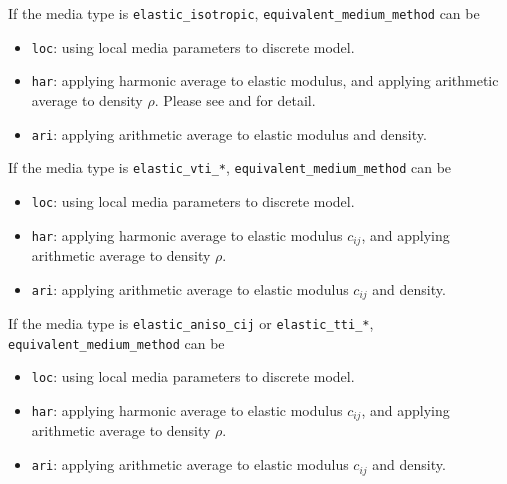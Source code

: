 If the media type is \texttt{elastic\_isotropic}, \texttt{equivalent\_medium\_method} can be
\begin{itemize}
 \item \texttt{loc}: using local media parameters to discrete model. 
 \item \texttt{har}: applying harmonic average to elastic modulus, and applying arithmetic average to density $\rho$. Please see \citet{moczo_3d_2002} and \citep{moczo_finite-difference_2014} for detail.
 \item \texttt{ari}: applying arithmetic average to elastic modulus and density. 
\end{itemize}

If the media type is \texttt{elastic\_vti\_*}, \texttt{equivalent\_medium\_method} can be
\begin{itemize}
 \item \texttt{loc}: using local media parameters to discrete model. 
 \item \texttt{har}: applying harmonic average to elastic modulus $c_{ij}$, and applying arithmetic average to density $\rho$.
 \item \texttt{ari}: applying arithmetic average to elastic modulus $c_{ij}$ and density. 
\end{itemize}

If the media type is \texttt{elastic\_aniso\_cij} or \texttt{elastic\_tti\_*}, \texttt{equivalent\_medium\_method} can be
\begin{itemize}
 \item \texttt{loc}: using local media parameters to discrete model. 
 \item \texttt{har}: applying harmonic average to elastic modulus $c_{ij}$, and applying arithmetic average to density $\rho$.
 \item \texttt{ari}: applying arithmetic average to elastic modulus $c_{ij}$ and density. 
\end{itemize}
